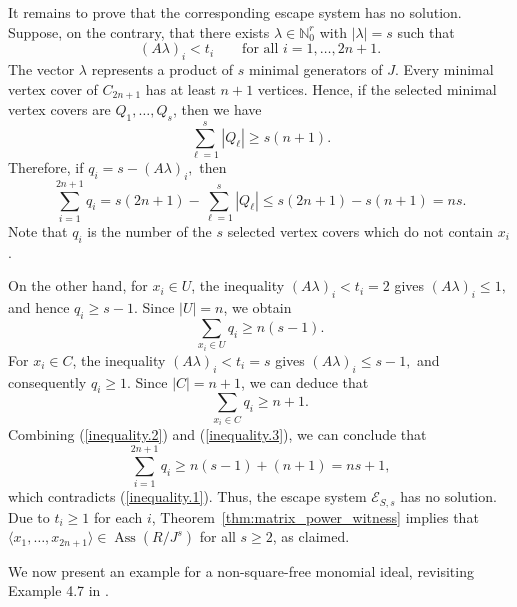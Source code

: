 \documentclass[11pt]{amsart}   %
\begin{document}
\begin{exm}
It remains to prove that the corresponding escape system has no
solution. Suppose, on the contrary, that there exists $\lambda\in\mathbb N_0^r$ with $|\lambda|=s$ such that
\[
(A\lambda)_i<t_i
\qquad
\text{for all }i=1,\ldots,2n+1.
\]
The vector $\lambda$ represents a product of $s$ minimal generators of $J$.
Every minimal vertex cover of $C_{2n+1}$ has at least $n+1$
vertices. Hence, if the selected minimal vertex covers are
$Q_1,\ldots,Q_s$, then we have
\[
\sum_{\ell=1}^s |Q_\ell|\geq s(n+1).
\]
Therefore, if  $q_i=s-(A\lambda)_i,$ then 
\begin{equation}
\sum_{i=1}^{2n+1}q_i
=
s(2n+1)-\sum_{\ell=1}^s|Q_\ell|
\leq
s(2n+1)-s(n+1)=ns.\label{inequality.1}
\end{equation} Note that $q_i$ is the number of the $s$ selected vertex covers which do not contain $x_i$. 

On the other hand, for $x_i\in U$, the inequality $(A\lambda)_i<t_i=2$ gives $(A\lambda)_i\leq1,$
and hence $q_i\geq s-1.$  Since $|U|=n$, we obtain
\begin{equation}
\sum_{x_i\in U}q_i\geq n(s-1). \label{inequality.2}
\end{equation}
For $x_i\in C$, the inequality $(A\lambda)_i<t_i=s$ gives $(A\lambda)_i\leq s-1,$ and consequently $q_i\geq1.$
Since $|C|=n+1$, we can deduce that
\begin{equation}
\sum_{x_i\in C}q_i\geq n+1. \label{inequality.3}
\end{equation}
Combining (\ref{inequality.2}) and (\ref{inequality.3}), we can conclude that
\[
\sum_{i=1}^{2n+1}q_i
\geq n(s-1)+(n+1)
=ns+1,
\]
which contradicts (\ref{inequality.1}). Thus,  the escape system $\mathcal E_{S,s}$ has no solution.
Due to  $t_i\geq1$ for each $i$, Theorem~\ref{thm:matrix_power_witness} implies that
$\langle x_1,\ldots,x_{2n+1}\rangle\in\operatorname{Ass}(R/J^s)$ for all $s\geq 2$, as claimed.
\end{exm}


We now present an example for a non-square-free monomial ideal, revisiting Example 4.7 in \cite{CNQ}.
\end{document}
